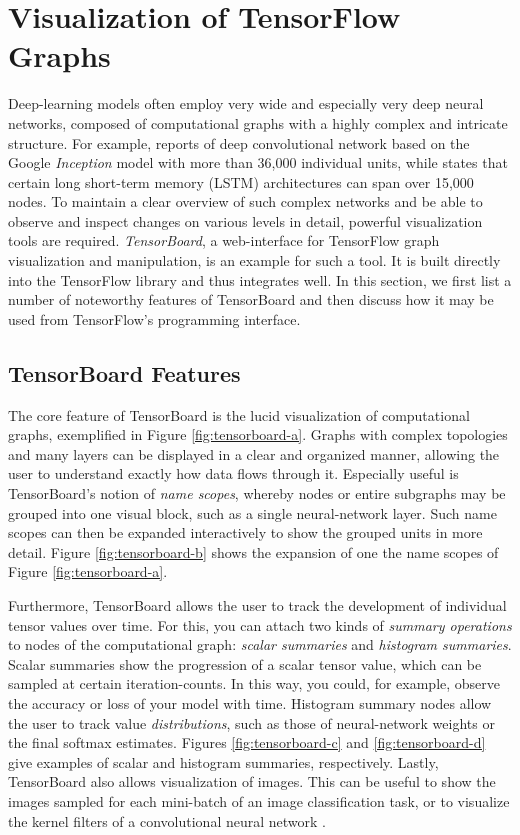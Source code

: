 \section{Visualization of TensorFlow Graphs}\label{sec:visual}

Deep-learning models often employ very wide and especially very deep neural
networks, composed of computational graphs with a highly complex and intricate
structure. For example, \cite{inception} reports of deep convolutional network
based on the Google \emph{Inception} model with more than 36,000 individual
units, while \cite{tensorflow} states that certain long short-term memory (LSTM)
architectures can span over 15,000 nodes. To maintain a clear overview of such
complex networks and be able to observe and inspect changes on various levels in
detail, powerful visualization tools are required. \emph{TensorBoard}, a
web-interface for TensorFlow graph visualization and manipulation, is an example
for such a tool. It is built directly into the TensorFlow library and thus
integrates well. In this section, we first list a number of noteworthy features
of TensorBoard and then discuss how it may be used from TensorFlow's programming
interface.

\subsection{TensorBoard Features}\label{sec:visual-features}

The core feature of TensorBoard is the lucid visualization of computational
graphs, exemplified in Figure \ref{fig:tensorboard-a}. Graphs with complex
topologies and many layers can be displayed in a clear and organized manner,
allowing the user to understand exactly how data flows through it. Especially
useful is TensorBoard's notion of \emph{name scopes}, whereby nodes or entire
subgraphs may be grouped into one visual block, such as a single neural-network
layer. Such name scopes can then be expanded interactively to show the grouped
units in more detail. Figure \ref{fig:tensorboard-b} shows the expansion of one
the name scopes of Figure \ref{fig:tensorboard-a}.

Furthermore, TensorBoard allows the user to track the development of individual
tensor values over time. For this, you can attach two kinds of \emph{summary
  operations} to nodes of the computational graph: \emph{scalar summaries} and
\emph{histogram summaries}. Scalar summaries show the progression of a scalar
tensor value, which can be sampled at certain iteration-counts. In this way, you
could, for example, observe the accuracy or loss of your model with
time. Histogram summary nodes allow the user to track value
\emph{distributions}, such as those of neural-network weights or the final
softmax estimates. Figures \ref{fig:tensorboard-c} and \ref{fig:tensorboard-d}
give examples of scalar and histogram summaries, respectively. Lastly,
TensorBoard also allows visualization of images. This can be useful to show the
images sampled for each mini-batch of an image classification task, or to
visualize the kernel filters of a convolutional neural network
\cite{tensorflow}.

